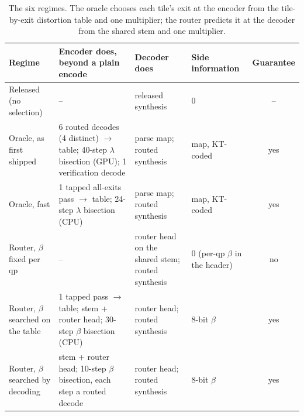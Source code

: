 \documentclass[10pt]{article}
\begin{document}
\begin{table}[h]\centering\footnotesize
\begin{tabularx}{\linewidth}{@{}p{3.2cm}Xp{3.3cm}p{2.3cm}c@{}}\toprule
Regime & Encoder does, beyond a plain encode & Decoder does & Side information & Guarantee \\\midrule
Released (no selection) & -- & released synthesis & 0 & -- \\
Oracle, as first shipped & 6 routed decodes (4 distinct) $\to$ table; 40-step $\lambda$ bisection (GPU); 1 verification decode & parse map; routed synthesis & map, KT-coded & yes \\
Oracle, fast & 1 tapped all-exits pass $\to$ table; 24-step $\lambda$ bisection (CPU) & parse map; routed synthesis & map, KT-coded & yes \\
Router, $\beta$ fixed per qp & -- & router head on the shared stem; routed synthesis & 0 (per-qp $\beta$ in the header) & no \\
Router, $\beta$ searched on the table & 1 tapped pass $\to$ table; stem + router head; 30-step $\beta$ bisection (CPU) & router head; routed synthesis & 8-bit $\beta$ & yes \\
Router, $\beta$ searched by decoding & stem + router head; 10-step $\beta$ bisection, each step a routed decode & router head; routed synthesis & 8-bit $\beta$ & yes \\
\bottomrule\end{tabularx}
\caption{The six regimes. The oracle chooses each tile's exit at the encoder from the tile-by-exit distortion table and one multiplier; the router predicts it at the decoder from the shared stem and one multiplier.}\end{table}
\end{document}
